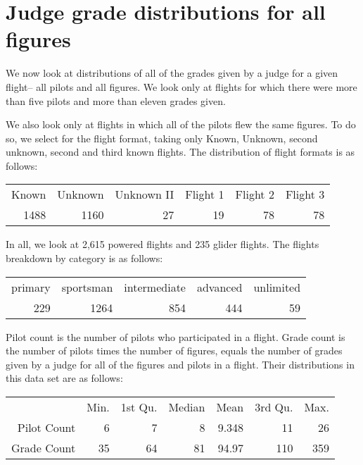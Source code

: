 \section{Judge grade distributions for all figures}

We now look at distributions of all of the grades given by a judge for
a given flight-- all pilots and all figures. We look only at flights for
which there were more than five pilots and more than eleven grades given.

We also look only at flights in which all of the pilots flew the same figures.
To do so, we select for the flight format, taking only Known, Unknown, second
unknown, second and third known flights. The distribution of flight formats is
as follows:

\begin{table}[h!]
\centering
\begin{tabular}{r r r r r r}
Known & Unknown & Unknown II  &  Flight 1  & Flight 2 & Flight 3  \\
1488  & 1160 & 27  & 19  & 78 & 78  \\
\end{tabular}
\end{table}

In all, we look at 2,615 powered flights and 235 glider flights. The flights
breakdown by category is as follows:

\begin{table}[h!]
\centering
\begin{tabular}{r r r r r}
primary  & sportsman & intermediate  &  advanced  & unlimited  \\
    229  &      1264 &          854  &       444  &        59  \\
\end{tabular}
\end{table}

Pilot count is the number of pilots who participated in a flight.
Grade count is the number of pilots times the number of figures, equals
the number of grades given by a judge for all of the figures and pilots in
a flight. Their distributions in this data set are as follows:

\begin{table}[h!]
\centering
\begin{tabular}{r | r r r r r r}
& Min. & 1st Qu. & Median & Mean & 3rd Qu. & Max. \\
Pilot Count &  6 &  7 &  8 & 9.348 &  11 &  26 \\
Grade Count & 35 & 64 & 81 & 94.97 & 110 & 359 \\
\end{tabular}
\end{table}

